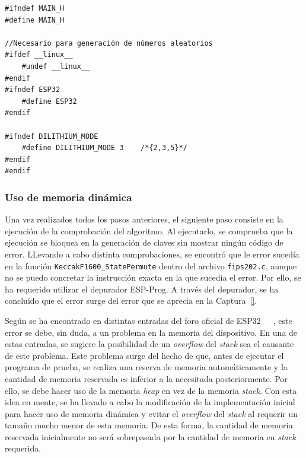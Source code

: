 \begin{lstlisting}[label={lst:dilithium-mainh},style=Cnice,firstnumber=1,caption={Archivo \texttt{Dilithium/main/include/main.h}.}]
#ifndef MAIN_H
#define MAIN_H

//Necesario para generación de números aleatorios
#ifdef __linux__
    #undef __linux__
#endif
#ifndef ESP32
    #define ESP32
#endif

#ifndef DILITHIUM_MODE
    #define DILITHIUM_MODE 3	/*{2,3,5}*/
#endif
#endif
\end{lstlisting}


\subsubsection{Uso de memoria dinámica}\label{subsubsec:dilithium-dynamic}

Una vez realizados todos los pasos anteriores, el siguiente paso consiste en la ejecución de la comprobación del algoritmo.
Al ejecutarlo, se comprueba que la ejecución se bloquea en la generación de claves sin mostrar ningún código de error.
LLevando a cabo distinta comprobaciones, se encontró que le error sucedía en la función \texttt{KeccakF1600\_StatePermute} dentro del archivo \texttt{fips202.c}, aunque no se puedo concretar la instrucción exacta en la que sucedía el error.
Por ello, se ha requerido utilizar el depurador ESP-Prog.
A través del depurador, se ha concluido que el error surge del error que se aprecia en la Captura~\ref{}.


Según se ha encontrado en distintas entradas del foro oficial de ESP32~\cite{esp32-forum1}~\cite{esp32-forum2}~\cite{esp32-forum2}, este error se debe, sin duda, a un problema en la memoria del dispositivo.
En una de estas entradas, se sugiere la posibilidad de un \textit{overflow} del \textit{stack} sea el causante de este problema.
Este problema surge del hecho de que, antes de ejecutar el programa de prueba, se realiza una reserva de memoria automáticamente y la cantidad de memoria reservada es inferior a la necesitada posteriormente.
Por ello, se debe hacer uso de la memoria \textit{heap} en vez de la memoria \textit{stack}.
Con esta idea en mente, se ha llevado a cabo la modificación de la implementación inicial para hacer uso de memoria dinámica y evitar el \textit{overflow} del \textit{stack} al requerir un tamaño mucho menor de esta memoria.
De esta forma, la cantidad de memoria reservada inicialmente no será sobrepasada por la cantidad de memoria en \textit{stack} requerida.

